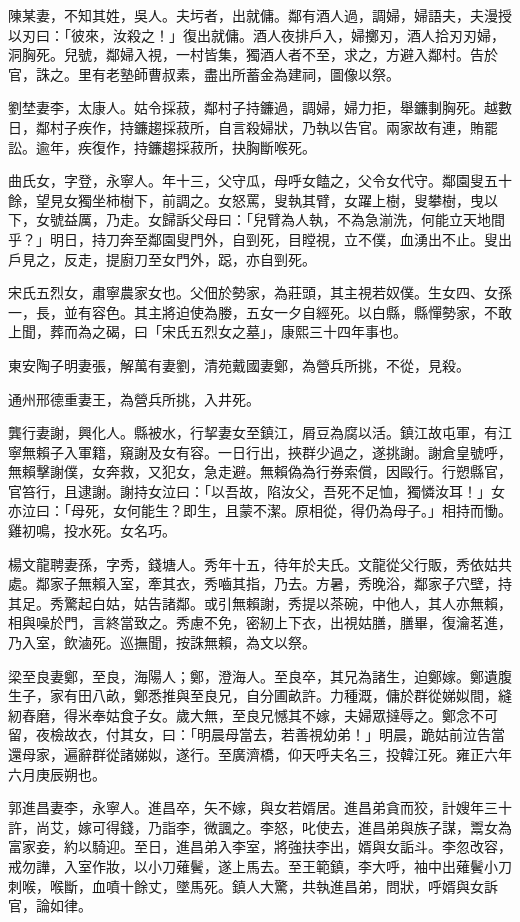 \begin{pinyinscope}
陳某妻，不知其姓，吳人。夫圬者，出就傭。鄰有酒人過，調婦，婦語夫，夫漫授以刃曰：「彼來，汝殺之！」復出就傭。酒人夜排戶入，婦擲刃，酒人拾刃刃婦，洞胸死。兒號，鄰婦入視，一村皆集，獨酒人者不至，求之，方避入鄰村。告於官，誅之。里有老塾師曹叔素，盡出所蓄金為建祠，圖像以祭。

劉埜妻李，太康人。姑令採菽，鄰村子持鐮過，調婦，婦力拒，舉鐮剚胸死。越數日，鄰村子疾作，持鐮趨採菽所，自言殺婦狀，乃執以告官。兩家故有連，賄罷訟。逾年，疾復作，持鐮趨採菽所，抉胸斷喉死。

曲氏女，字登，永寧人。年十三，父守瓜，母呼女饁之，父令女代守。鄰園叟五十餘，望見女獨坐柿樹下，前調之。女怒罵，叟執其臂，女躍上樹，叟攀樹，曳以下，女號益厲，乃走。女歸訴父母曰：「兒臂為人執，不為急湔洗，何能立天地間乎？」明日，持刀奔至鄰園叟門外，自剄死，目瞠視，立不僕，血湧出不止。叟出戶見之，反走，提廚刀至女門外，跽，亦自剄死。

宋氏五烈女，肅寧農家女也。父佃於勢家，為莊頭，其主視若奴僕。生女四、女孫一，長，並有容色。其主將迫使為媵，五女一夕自經死。以白縣，縣憚勢家，不敢上聞，葬而為之碣，曰「宋氏五烈女之墓」，康熙三十四年事也。

東安陶子明妻張，解萬有妻劉，清苑戴國妻鄭，為營兵所挑，不從，見殺。

通州邢德重妻王，為營兵所挑，入井死。

龔行妻謝，興化人。縣被水，行挈妻女至鎮江，屑豆為腐以活。鎮江故屯軍，有江寧無賴子入軍籍，窺謝及女有容。一日行出，挾群少過之，遂挑謝。謝倉皇號呼，無賴擊謝僕，女奔救，又犯女，急走避。無賴偽為行券索償，因毆行。行愬縣官，官笞行，且逮謝。謝持女泣曰：「以吾故，陷汝父，吾死不足恤，獨憐汝耳！」女亦泣曰：「母死，女何能生？即生，且蒙不潔。原相從，得仍為母子。」相持而慟。雞初鳴，投水死。女名巧。

楊文龍聘妻孫，字秀，錢塘人。秀年十五，待年於夫氏。文龍從父行販，秀依姑共處。鄰家子無賴入室，牽其衣，秀嚙其指，乃去。方暑，秀晚浴，鄰家子穴壁，持其足。秀驚起白姑，姑告諸鄰。或引無賴謝，秀提以茶碗，中他人，其人亦無賴，相與噪於門，言終當致之。秀慮不免，密紉上下衣，出視姑膳，膳畢，復瀹茗進，乃入室，飲滷死。巡撫聞，按誅無賴，為文以祭。

梁至良妻鄭，至良，海陽人；鄭，澄海人。至良卒，其兄為諸生，迫鄭嫁。鄭遺腹生子，家有田八畝，鄭悉推與至良兄，自分圃畝許。力種溉，傭於群從娣姒間，縫紉舂磨，得米奉姑食子女。歲大無，至良兄憾其不嫁，夫婦眾撻辱之。鄭念不可留，夜檢故衣，付其女，曰：「明晨母當去，若善視幼弟！」明晨，跪姑前泣告當還母家，遍辭群從諸娣姒，遂行。至廣濟橋，仰天呼夫名三，投韓江死。雍正六年六月庚辰朔也。

郭進昌妻李，永寧人。進昌卒，矢不嫁，與女若婿居。進昌弟貪而狡，計嫂年三十許，尚艾，嫁可得錢，乃詣李，微諷之。李怒，叱使去，進昌弟與族子謀，鬻女為富家妾，約以騎迎。至日，進昌弟入李室，將強扶李出，婿與女詬斗。李忽改容，戒勿譁，入室作妝，以小刀薙鬢，遂上馬去。至王範鎮，李大呼，袖中出薙鬢小刀刺喉，喉斷，血噴十餘丈，墜馬死。鎮人大驚，共執進昌弟，問狀，呼婿與女訴官，論如律。


\end{pinyinscope}
